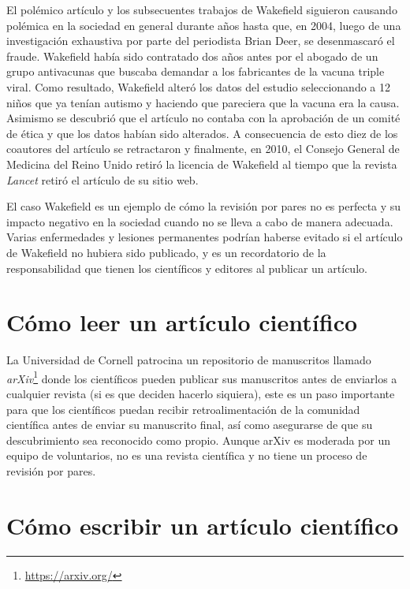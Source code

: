 El polémico artículo y los subsecuentes trabajos de Wakefield siguieron causando
polémica en la sociedad en general durante años hasta que, en 2004, luego de una
investigación exhaustiva por parte del periodista Brian Deer, se desenmascaró el
fraude\cite{Deerc1127}.
Wakefield había sido contratado dos años antes por el abogado de un grupo
antivacunas que buscaba demandar a los fabricantes de la vacuna triple viral.
Como resultado, Wakefield alteró los datos del estudio seleccionando a 12 niños
que ya tenían autismo y haciendo que pareciera que la vacuna era la causa.
Asimismo se descubrió que el artículo no contaba con la aprobación de un comité
de ética y que los datos habían sido alterados.
A consecuencia de esto diez de los coautores del artículo se retractaron y
finalmente, en 2010, el Consejo General de Medicina del Reino Unido retiró la
licencia de Wakefield al tiempo que la revista \emph{Lancet} retiró el artículo
de su sitio web.

El caso Wakefield es un ejemplo de cómo la revisión por pares no es perfecta y
su impacto negativo en la sociedad cuando no se lleva a cabo de manera
adecuada.
Varias enfermedades y lesiones permanentes podrían haberse evitado si el
artículo de Wakefield no hubiera sido publicado, y es un recordatorio de la
responsabilidad que tienen los científicos y editores al publicar un artículo.

\section{Cómo leer un artículo científico}
\label{sec:comoleer}

La Universidad de Cornell patrocina un repositorio de manuscritos llamado
\emph{arXiv}\footnote{\href{https://arxiv.org/}{\url{https://arxiv.org/}}} donde los
científicos pueden publicar sus manuscritos antes de enviarlos a cualquier
revista (si es que deciden hacerlo siquiera), este es un paso importante para
que los científicos puedan recibir retroalimentación de la comunidad científica
antes de enviar su manuscrito final, así como asegurarse de que su
descubrimiento sea reconocido como propio.
Aunque arXiv es moderada por un equipo de voluntarios, no es una revista
científica y no tiene un proceso de revisión por pares.


\section{Cómo escribir un artículo científico}
\label{sec:comoescribir}
